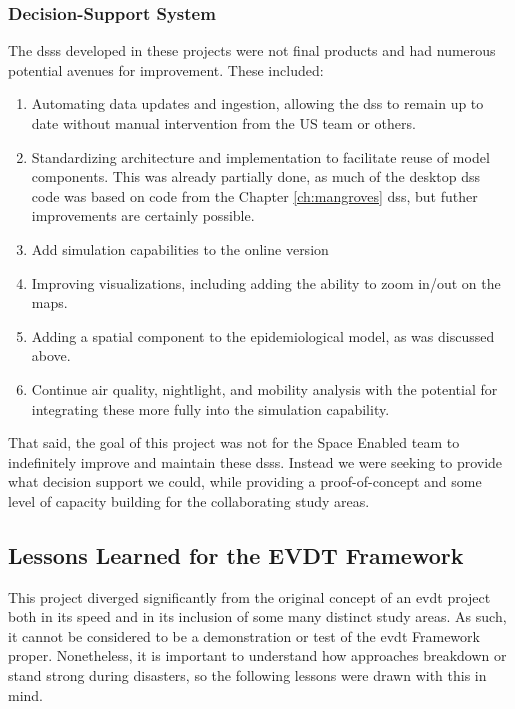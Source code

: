 \subsubsection{Decision-Support System}

The \acp{dss} developed in these projects were not final products and had numerous potential avenues for improvement. These included:

\begin{enumerate}[itemsep=0pt,parsep=0pt]
    \item Automating data updates and ingestion, allowing the \ac{dss} to remain up to date without manual intervention from the US team or others. 
    \item Standardizing architecture and implementation to facilitate reuse of model components. This was already partially done, as much of the desktop \ac{dss} code was based on code from the Chapter \ref{ch:mangroves} \ac{dss}, but futher improvements are certainly possible.
    \item Add simulation capabilities to the online version
    \item Improving visualizations, including adding the ability to zoom in/out on the maps.
    \item Adding a spatial component to the epidemiological model, as was discussed above.
    \item Continue air quality, nightlight, and mobility analysis with the potential for integrating these more fully into the simulation capability. 
\end{enumerate}

That said, the goal of this project was not for the Space Enabled team to indefinitely improve and maintain these \acp{dss}. Instead we were seeking to provide what decision support we could, while providing a proof-of-concept and some level of capacity building for the collaborating study areas. 

\subsection{Lessons Learned for the EVDT Framework} \label{sec:vida-lessons}

This project diverged significantly from the original concept of an \ac{evdt} project both in its speed and in its inclusion of some many distinct study areas. As such, it cannot be considered to be a demonstration or test of the \ac{evdt} Framework proper. Nonetheless, it is important to understand how approaches breakdown or stand strong during disasters, so the following lessons were drawn with this in mind.

